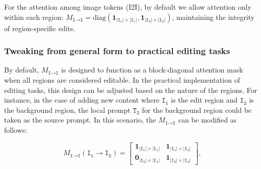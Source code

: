 \documentclass{article}
\begin{document}
For the attention among image tokens (I2I), by default we allow attention only within each region: $M_{\texttt{I}\to\texttt{I}}=\mathrm{diag}(\mathbf{1}_{|\texttt{I}_\texttt{1}| \times |\texttt{I}_\texttt{1}|}, \mathbf{1}_{|\texttt{I}_\texttt{2}| \times |\texttt{I}_\texttt{2}|})$, maintaining the integrity of region-specific edits.

\subsubsection{Tweaking from general form to practical editing tasks}

By default, $M_{\texttt{I}\to\texttt{I}}$ is designed to function as a block-diagonal attention mask when all regions are considered editable. In the practical implementation of editing tasks, this design can be adjusted based on the nature of the regions. For instance, in the case of adding new content where $\texttt{I}_\texttt{1}$ is the edit region and $\texttt{I}_\texttt{2}$ is the background region,
the local prompt $\texttt{T}_\texttt{2}$ for the background region could be taken as the source prompt.
In this scenario, the $M_{\texttt{I}\to\texttt{I}}$ can be modified as follows:

\begin{equation}
    M_{\texttt{I}\to\texttt{I}}(\texttt{I}_\texttt{1}\to\texttt{I}_\texttt{2})%
    =
    \begin{bmatrix}
        \mathbf{1}_{|\texttt{I}_\texttt{1}|\times|\texttt{I}_\texttt{1}|} &  \mathbf{1}_{|\texttt{I}_\texttt{1}|\times|\texttt{I}_\texttt{2}|}\\
        \mathbf{0}_{|\texttt{I}_\texttt{2}|\times|\texttt{I}_\texttt{1}|} &  \mathbf{1}_{|\texttt{I}_\texttt{2}|\times|\texttt{I}_\texttt{2}|}
    \end{bmatrix},
    \label{eq:i2i_1}
\end{equation}
\end{document}
